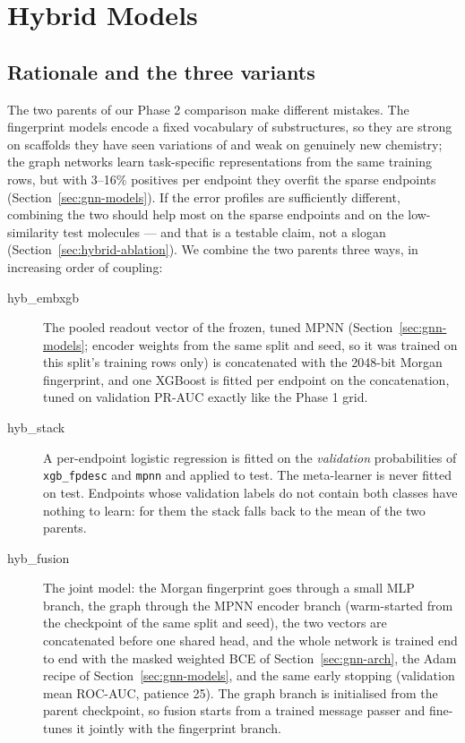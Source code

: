 \section{Hybrid Models}
\label{sec:hybrid}

\subsection{Rationale and the three variants}
The two parents of our Phase 2 comparison make different mistakes. The fingerprint models
encode a fixed vocabulary of substructures, so they are strong on scaffolds they have seen
variations of and weak on genuinely new chemistry; the graph networks learn task-specific
representations from the same training rows, but with 3--16\% positives per endpoint they
overfit the sparse endpoints (Section~\ref{sec:gnn-models}). If the error profiles are
sufficiently different, combining the two should help most on the sparse endpoints and on
the low-similarity test molecules --- and that is a testable claim, not a slogan
(Section~\ref{sec:hybrid-ablation}). We combine the two parents three ways, in increasing
order of coupling:

\begin{description}
\item[hyb\_embxgb] The pooled readout vector of the frozen, tuned MPNN
(Section~\ref{sec:gnn-models}; encoder weights from the same split and seed, so it was
trained on this split's training rows only) is concatenated with the 2048-bit Morgan
fingerprint, and one XGBoost is fitted per endpoint on the concatenation, tuned on
validation PR-AUC exactly like the Phase 1 grid.
\item[hyb\_stack] A per-endpoint logistic regression is fitted on the \emph{validation}
probabilities of \texttt{xgb\_fpdesc} and \texttt{mpnn} and applied to test. The
meta-learner is never fitted on test. Endpoints whose validation labels do not contain
both classes have nothing to learn: for them the stack falls back to the mean of the two
parents.
\item[hyb\_fusion] The joint model: the Morgan fingerprint goes through a small MLP branch,
the graph through the MPNN encoder branch (warm-started from the checkpoint of the same
split and seed), the two vectors are concatenated before one shared head, and the whole
network is trained end to end with the masked weighted BCE of
Section~\ref{sec:gnn-arch}, the Adam recipe of Section~\ref{sec:gnn-models}, and the same
early stopping (validation mean ROC-AUC, patience 25). The graph branch is initialised
from the parent checkpoint, so fusion starts from a trained message passer and fine-tunes
it jointly with the fingerprint branch.
\end{description}

